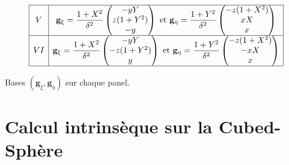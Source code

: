 \begin{table}[htbp]
\begin{center}
\begin{equation*}
\begin{array}{|c|c|}
\hline
V & \mathbf{g}_{\xi} = \dfrac{1+X^2}{\delta^2} \begin{pmatrix}
-yY \\ z(1+Y^2) \\ -y
\end{pmatrix} \text{ et } \mathbf{g}_{\eta} = \dfrac{1+Y^2}{\delta^2} \begin{pmatrix}
-z(1+X^2) \\ xX \\ x
\end{pmatrix} \\

\hline
VI & \mathbf{g}_{\xi} = \dfrac{1+X^2}{\delta^2} \begin{pmatrix}
-yY \\ -z(1+Y^2) \\ y
\end{pmatrix} \text{ et } \mathbf{g}_{\eta} = \dfrac{1+Y^2}{\delta^2} \begin{pmatrix}
-z(1+X^2) \\ -xX \\ x
\end{pmatrix}\\
\hline

\end{array}
\end{equation*}
\end{center}
\caption{Bases $\left( \mathbf{g}_{\xi}, \mathbf{g}_{\eta} \right)$ sur chaque panel.}
\label{tab: base g_xi g_eta}
\end{table}
















\section{Calcul intrinsèque sur la Cubed-Sphère}


















